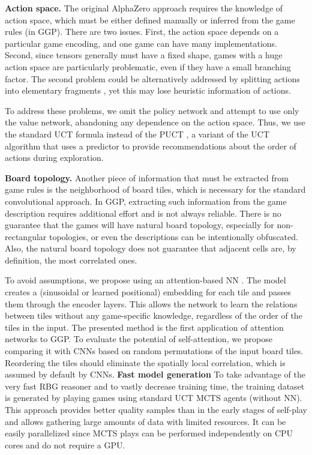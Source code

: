 \documentclass[letterpaper]{article} %
\begin{document}
\textbf{Action space.}
The original AlphaZero approach requires the knowledge of action space, which must be either defined manually or inferred from the game rules (in GGP).
There are two issues.
First, the action space depends on a particular game encoding, and one game can have many implementations. Second, since tensors generally must have a fixed shape, games with a huge action space are particularly problematic, even if they have a small branching factor.
The second problem could be alternatively addressed by splitting actions into elementary fragments \cite{Kowalski2022SplitMoves}, yet this may lose heuristic information of actions.

To address these problems, we omit the policy network and attempt to use only the value network, abandoning any dependence on the action space. Thus, we use the standard UCT formula instead of the PUCT \cite{Rosin2011}, a variant of the UCT algorithm that uses a predictor to provide recommendations about the order of actions during exploration.



\textbf{Board topology.}
Another piece of information that must be extracted from game rules is the neighborhood of board tiles, which is necessary for the standard convolutional approach.
In GGP, extracting such information from the game description requires additional effort and is not always reliable.
There is no guarantee that the games will have natural board topology, especially for non-rectangular topologies, or even the descriptions can be intentionally obfuscated.
Also, the natural board topology does not guarantee that adjacent cells are, by definition, the most correlated ones.

To avoid assumptions, we propose using an attention-based NN \cite{vaswani2017attention}. The model creates a (sinusoidal or learned positional) embedding for each tile and passes them through the encoder layers. This allows the network to learn the relations between tiles without any game-specific knowledge, regardless of the order of the tiles in the input. The presented method is the first application of attention networks to GGP.
\vspace{-1.68mm}
To evaluate the potential of self-attention, we propose comparing it with CNNs based on random permutations of the input board tiles. Reordering the tiles should eliminate the spatially local correlation, which is assumed by default by CNNs.  \textbf{Fast model generation}
To take advantage of the very fast RBG reasoner and to vastly decrease training time, the training dataset is generated by playing games using standard UCT MCTS agents (without NN). This approach provides better quality samples than in the early stages of self-play and allows gathering large amounts of data with limited resources. It can be easily parallelized since MCTS plays can be performed independently on CPU cores and do not require a GPU.
\end{document}
